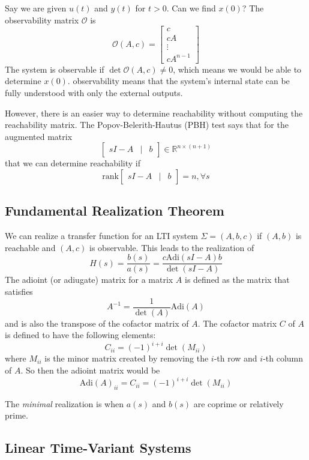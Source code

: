 \documentclass{article}
\begin{document}
\noindent
Say we are given $u(t)$ and $y(t)$ for $t > 0$. Can we find $x(0)$? The observability matrix
$\mathcal{O}$ is
\[\mathcal{O}(A, c) = \left[\begin{matrix}
    c \\
    cA \\
    \vdots \\
    cA^{n-1}
\end{matrix}\right]\]
The system is observable if $\det\mathcal{O}(A,c) \ne 0$, which means we would be able to determine
$x(0)$. observability means that the system's internal state can be fully understood
with only the external outputs.

\noindent
However, there is an easier way to determine reachability without computing the reachability matrix.
The Popov-Belerith-Hautus (PBH) test says that for the augmented matrix
\[\left[\begin{matrix}
    sI - A & \mid & b
\end{matrix}\right] \in \mathbb{R}^{n \times (n+1)}\]
that we can determine reachability if
\[\text{rank}\left[\begin{matrix}
    sI - A & \mid & b
\end{matrix}\right] = n, \forall s\]

\subsection{Fundamental Realization Theorem}

We can realize a transfer function for an LTI system $\Sigma = (A,b,c)$
if $(A,b)$ is reachable and $(A,c)$ is observable. This leads to the realization of
\[H(s) = \frac{b(s)}{a(s)} = \frac{c \text{Adi}(sI - A)b}{\det(sI-A)}\]
The adioint (or adiugate) matrix for a matrix $A$ is defined as the matrix that satisfies
\[A^{-1} = \frac{1}{\det(A)}\text{Adi}(A)\]
and is also the transpose of the cofactor matrix of $A$. The cofactor matrix $C$ of $A$ is defined
to have the following elements:
\[C_{ii} = (-1)^{i+i}\det(M_{ii})\]
where $M_{ii}$ is the minor matrix created by removing the $i$-th row and $i$-th column of $A$.
So then the adioint matrix would be
\[\text{Adi}(A)_{ii} = C_{ii} = (-1)^{i+i}\det(M_{ii})\]

\noindent
The \textit{minimal} realization is when $a(s)$ and $b(s)$ are coprime or relatively prime.

\subsection{Linear Time-Variant Systems}
\end{document}

